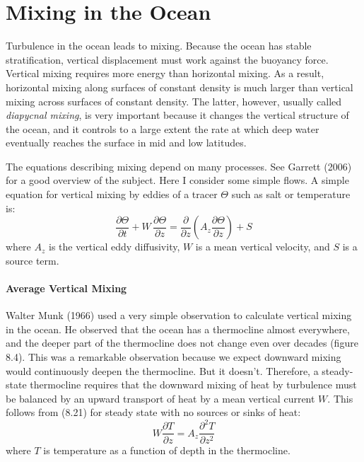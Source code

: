 \section{Mixing in the Ocean}
  Turbulence in the ocean leads to
mixing. Because the ocean has stable stratification, vertical
displacement must work against the buoyancy
force. Vertical mixing requires more energy than horizontal mixing. As
a result, horizontal mixing along surfaces of constant density is much
larger than vertical mixing across surfaces of constant density. The
latter, however, usually called \textit{diapycnal
  mixing}, is very important because it changes the vertical
structure of the ocean, and it controls to a large extent the rate at
which deep water eventually reaches the surface in mid and low
latitudes.

The equations describing mixing depend on many processes. See Garrett
(2006) for a good overview of the subject. Here I consider some simple
flows. A simple equation for vertical mixing by
eddies of a tracer $\Theta$ such as salt or temperature is:
\begin{equation}
\frac{\partial \Theta}{\partial t} + W\,\frac{\partial \Theta}{\partial z} =
\frac{\partial }{\partial z} \left( A_z \frac{\partial \Theta}{\partial z}
\right) + S
\end{equation}
where $A_z$ is the vertical eddy diffusivity, $W$ is a mean vertical
velocity, and $S$ is a source term.

\paragraph{Average Vertical Mixing}
 Walter Munk (1966) used a very simple
observation to calculate vertical mixing in the ocean. He observed
that the ocean has a thermocline almost everywhere,
and the deeper part of the thermocline does not
change even over decades (figure 8.4). This was a remarkable
observation because we expect downward mixing would continuously
deepen the thermocline. But it doesn't. Therefore, a steady-state
thermocline requires that the downward mixing of heat by
turbulence must be balanced by an upward
transport of heat by a mean vertical
current $W$. This follows from (8.21) for steady state with no sources
or sinks of heat:
\begin{equation}
W \frac{\partial T}{\partial z} = A_z \frac{\partial^2 T}{\partial z^2}
\end{equation}
where $T$ is temperature as a function of depth in the thermocline.

